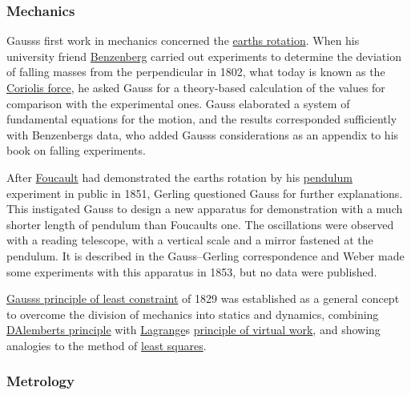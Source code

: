 \subsubsection{Mechanics}\label{Mechanics}

Gauss\textquotesingle s first work in mechanics concerned the \href{https://en.wikipedia.org/wiki/Earth's_rotation}{earth\textquotesingle s rotation}. When his university friend \href{https://en.wikipedia.org/wiki/Johann_Benzenberg}{Benzenberg} carried out experiments to determine the deviation of falling masses from the perpendicular in 1802, what today is known as the \href{https://en.wikipedia.org/wiki/Coriolis_force}{Coriolis force}, he asked Gauss for a theory-based calculation of the values for comparison with the experimental ones. Gauss elaborated a system of fundamental equations for the motion, and the results corresponded sufficiently with Benzenberg\textquotesingle s data, who added Gauss\textquotesingle s considerations as an appendix to his book on falling experiments.

After \href{https://en.wikipedia.org/wiki/Léon_Foucault}{Foucault} had demonstrated the earth\textquotesingle s rotation by his \href{https://en.wikipedia.org/wiki/Foucault_pendulum}{pendulum} experiment in public in 1851, Gerling questioned Gauss for further explanations. This instigated Gauss to design a new apparatus for demonstration with a much shorter length of pendulum than Foucault\textquotesingle s one. The oscillations were observed with a reading telescope, with a vertical scale and a mirror fastened at the pendulum. It is described in the Gauss--Gerling correspondence and Weber made some experiments with this apparatus in 1853, but no data were published.

\href{https://en.wikipedia.org/wiki/Gauss's_principle_of_least_constraint}{Gauss\textquotesingle s principle of least constraint} of 1829 was established as a general concept to overcome the division of mechanics into statics and dynamics, combining \href{https://en.wikipedia.org/wiki/D'Alembert's_principle}{D\textquotesingle Alembert\textquotesingle s principle} with \href{https://en.wikipedia.org/wiki/Joseph-Louis_Lagrange}{Lagrange}\textquotesingle s \href{https://en.wikipedia.org/wiki/Principle_of_virtual_work}{principle of virtual work}, and showing analogies to the method of \href{https://en.wikipedia.org/wiki/Least_squares}{least squares}.


\subsubsection{Metrology}\label{Metrology}

